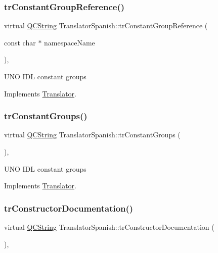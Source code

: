 \subsubsection{\texorpdfstring{trConstantGroupReference()}{trConstantGroupReference()}}
{\footnotesize\ttfamily virtual \mbox{\hyperlink{class_q_c_string}{Q\+C\+String}} Translator\+Spanish\+::tr\+Constant\+Group\+Reference (\begin{DoxyParamCaption}\item[{const char $\ast$}]{namespace\+Name }\end{DoxyParamCaption})\hspace{0.3cm}{\ttfamily [inline]}, {\ttfamily [virtual]}}

U\+NO I\+DL constant groups 

Implements \mbox{\hyperlink{class_translator}{Translator}}.

\mbox{\label{class_translator_spanish_a31fa0648138444dc75bef6b0ebdb0ed6}} 
\subsubsection{\texorpdfstring{trConstantGroups()}{trConstantGroups()}}
{\footnotesize\ttfamily virtual \mbox{\hyperlink{class_q_c_string}{Q\+C\+String}} Translator\+Spanish\+::tr\+Constant\+Groups (\begin{DoxyParamCaption}{ }\end{DoxyParamCaption})\hspace{0.3cm}{\ttfamily [inline]}, {\ttfamily [virtual]}}

U\+NO I\+DL constant groups 

Implements \mbox{\hyperlink{class_translator}{Translator}}.

\mbox{\label{class_translator_spanish_a06b69907de8fa6d1063dfd1835a737ba}} 
\subsubsection{\texorpdfstring{trConstructorDocumentation()}{trConstructorDocumentation()}}
{\footnotesize\ttfamily virtual \mbox{\hyperlink{class_q_c_string}{Q\+C\+String}} Translator\+Spanish\+::tr\+Constructor\+Documentation (\begin{DoxyParamCaption}{ }\end{DoxyParamCaption})\hspace{0.3cm}{\ttfamily [inline]}, {\ttfamily [virtual]}}

